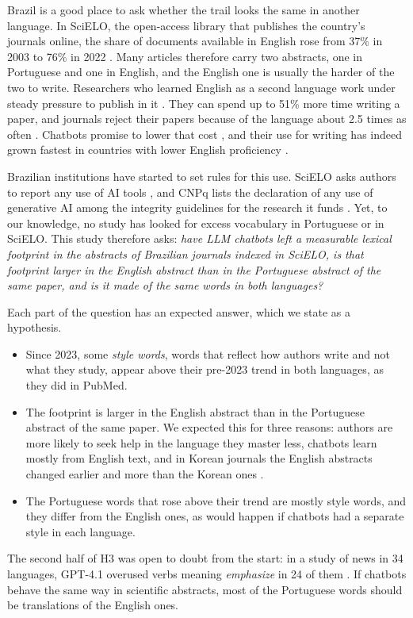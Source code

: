 \documentclass[12pt]{article}
\newcommand{\w}[1]{\textit{#1}}
\begin{document}
Brazil is a good place to ask whether the trail looks the same in another language. In SciELO, the
open-access library that publishes the country's journals online, the share of documents available
in English rose from 37\% in 2003 to 76\% in 2022 \cite{packer2024multilingualism}. Many articles
therefore carry two abstracts, one in Portuguese and one in English, and the English one is usually
the harder of the two to write. Researchers who learned
English as a second language work under steady pressure to publish in it \cite{meneghini2007there}.
They can spend up to 51\% more time writing a paper, and journals reject their papers because of
the language about 2.5 times as often \cite{amano2023manifold}. Chatbots promise to lower that cost
\cite{berdejoespinola2023ai}, and their use for writing has indeed grown fastest in countries with
lower English proficiency \cite{liu2025aiassisted}.

Brazilian institutions have started to set rules for this use. SciELO asks authors to report any
use of AI tools \cite{scielo2023guia}, and CNPq lists the declaration of any use of generative AI
among the integrity guidelines for the research it funds \cite{cnpq2026portaria}. Yet, to our
knowledge, no study has looked for excess vocabulary in Portuguese or in SciELO. This study
therefore asks:
\emph{have LLM chatbots left a measurable lexical footprint in the abstracts of Brazilian journals
indexed in SciELO, is that footprint larger in the English abstract than in the Portuguese abstract
of the same paper, and is it made of the same words in both languages?}

Each part of the question has an expected answer, which we state as a hypothesis.
\begin{itemize}[nosep, leftmargin=1.1cm, labelsep=0.3cm, itemsep=1pt, topsep=2pt]
  \item[\textbf{H1}] Since 2023, some \emph{style words}, words that reflect how authors write and
    not what they study, appear above their pre-2023 trend in both languages, as they did in PubMed.
  \item[\textbf{H2}] The footprint is larger in the English abstract than in the Portuguese abstract
    of the same paper. We expected this for three reasons: authors are more likely to seek help in
    the language they master less, chatbots learn mostly from English text, and in Korean journals
    the English abstracts changed earlier and more than the Korean ones
    \cite{koo2026lexical,lee2026korean}.
  \item[\textbf{H3}] The Portuguese words that rose above their trend are mostly style words, and
    they differ from the English ones, as would happen if chatbots had a separate style in each
    language.
\end{itemize}
The second half of H3 was open to doubt from the start: in a study of news in 34 languages, GPT-4.1
overused verbs meaning \w{emphasize} in 24 of them \cite{juzek2026crosslingual}. If chatbots behave
the same way in scientific abstracts, most of the Portuguese words should be translations of the
English ones.
\end{document}
